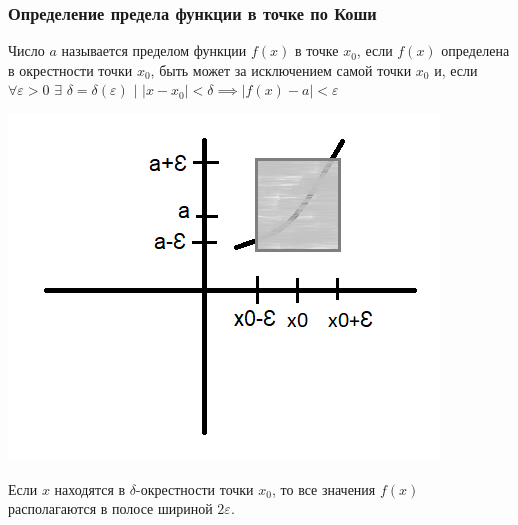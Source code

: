 \documentclass[12pt]{article}
\begin{document}
    \subsubsection*{Определение предела функции в точке по Коши}
    Число $a$ называется пределом функции $f(x)$ в точке $x_0$, если $f(x)$ определена в окрестности точки $x_0$, быть может за исключением самой точки $x_0$ и, если $\forall \varepsilon > 0$ $\exists$ $\delta = \delta(\varepsilon)$ $\big|$ $|x - x_0| < \delta \implies |f(x) - a| < \varepsilon$\\
    \begin{center}
        \includegraphics{3.1.2}
    \end{center}
    Если $x$ находятся в $\delta$-окрестности точки $x_0$, то все значения $f(x)$ располагаются в полосе шириной $2\varepsilon$.
\end{document}
